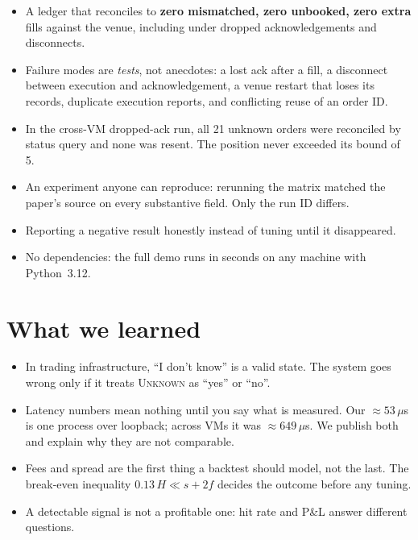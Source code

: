 \documentclass[11pt]{article}
\theoremstyle{remark}
\begin{document}
\begin{itemize}[leftmargin=1.5em, itemsep=2pt]
  \item A ledger that reconciles to \textbf{zero mismatched, zero unbooked, zero extra} fills
        against the venue, including under dropped acknowledgements and disconnects.
  \item Failure modes are \emph{tests}, not anecdotes: a lost ack after a fill, a disconnect
        between execution and acknowledgement, a venue restart that loses its records,
        duplicate execution reports, and conflicting reuse of an order ID.
  \item In the cross-VM dropped-ack run, all 21 unknown orders were reconciled by status query
        and none was resent. The position never exceeded its bound of 5.
  \item An experiment anyone can reproduce: rerunning the matrix matched the paper's source on
        every substantive field. Only the run ID differs.
  \item Reporting a negative result honestly instead of tuning until it disappeared.
  \item No dependencies: the full demo runs in seconds on any machine with Python~3.12.
\end{itemize}

\section*{What we learned}

\begin{itemize}[leftmargin=1.5em, itemsep=2pt]
  \item In trading infrastructure, ``I don't know'' is a valid state. The system goes wrong
        only if it treats \textsc{Unknown} as ``yes'' or ``no''.
  \item Latency numbers mean nothing until you say what is measured. Our $\approx 53\,\mu$s is
        one process over loopback; across VMs it was $\approx 649\,\mu$s. We publish both and
        explain why they are not comparable.
  \item Fees and spread are the first thing a backtest should model, not the last. The
        break-even inequality $0.13\,H \ll s + 2f$ decides the outcome before any tuning.
  \item A detectable signal is not a profitable one: hit rate and P\&L answer different
        questions.
\end{itemize}
\end{document}
